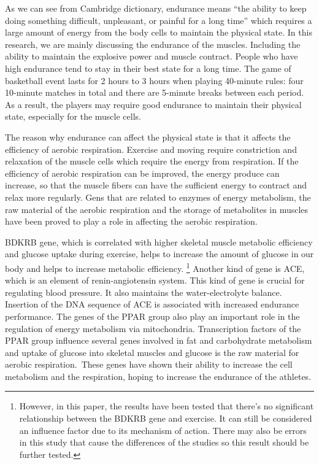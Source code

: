 \documentclass[man,floatsintext]{apa7}
\begin{document}
As we can see from Cambridge dictionary, endurance means ``the ability to keep doing something difficult, unpleasant, or painful for a long time'' which requires a large amount of energy from the body cells to maintain the physical state. In this research, we are mainly discussing the endurance of the muscles. Including the ability to maintain the explosive power and muscle contract. People who have high endurance tend to stay in their best state for a long time. The game of basketball event lasts for 2 hours to 3 hours when playing 40-minute rules: four 10-minute matches in total and there are 5-minute breaks between each period. As a result, the players may require good endurance to maintain their physical state, especially for the muscle cells.

The reason why endurance can affect the physical state is that it affects the efficiency of aerobic respiration.\autocite{forsmanh.KoripalloilijanFyysinenHarjoittelu2024} Exercise and moving require constriction and relaxation of the muscle cells which require the energy from respiration. If the efficiency of aerobic respiration can be improved, the energy produce can increase, so that the muscle fibers can have the sufficient energy to contract and relax more regularly. Gens that are related to enzymes of energy metabolism, the raw material of the aerobic respiration and the storage of metabolites in muscles have been proved to play a role in affecting the aerobic respiration.\autocite{ahmetovGenesAthleticPerformance2016}

BDKRB gene, which is correlated with higher skeletal muscle metabolic efficiency and glucose uptake during exercise, helps to increase the amount of glucose in our body and helps to increase metabolic efficiency.\autocite{mareksawczukPolymorphismBradykininReceptor2013} \footnote{However, in this paper, the results have been tested that there's no significant relationship between the BDKRB gene and exercise. It can still be considered an influence factor due to its mechanism of action. There may also be errors in this study that cause the differences of the studies so this result should be further tested.} Another kind of gene is ACE, which is an element of renin-angiotensin system. This kind of gene is crucial for regulating blood pressure. It also maintains the water-electrolyte balance.\autocite{loefflerBiochemieUndPathobiochemie2019} Insertion of the DNA sequence of ACE is associated with increased endurance performance. The genes of the PPAR group also play an important role in the regulation of energy metabolism via mitochondria. Transcription factors of the PPAR group influence several genes involved in fat and carbohydrate metabolism and uptake of glucose into skeletal muscles \autocite{loefflerBiochemieUndPathobiochemie2019} and glucose is the raw material for aerobic respiration. These genes have shown their ability to increase the cell metabolism and the respiration, hoping to increase the endurance of the athletes.
\end{document}

